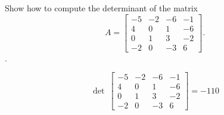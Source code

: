 
\begin{exerciseStatement}


Show how to compute the determinant of the matrix \[A= \left[\begin{array}{cccc}
-5 & -2 & -6 & -1 \\
4 & 0 & 1 & -6 \\
0 & 1 & 3 & -2 \\
-2 & 0 & -3 & 6
\end{array}\right] .\].


\end{exerciseStatement}
    
\begin{exerciseAnswer} 
\[\operatorname{det}\  \left[\begin{array}{cccc}
-5 & -2 & -6 & -1 \\
4 & 0 & 1 & -6 \\
0 & 1 & 3 & -2 \\
-2 & 0 & -3 & 6
\end{array}\right] = -110 \]
\end{exerciseAnswer}
    

